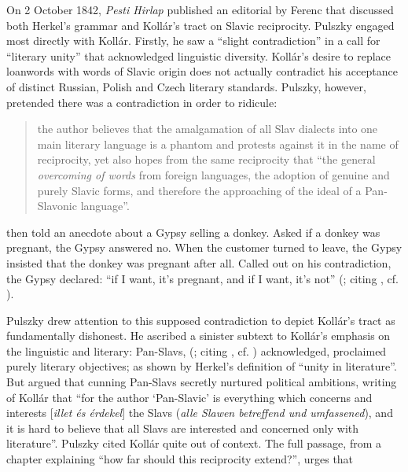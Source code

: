 On 2 October 1842, \textit{Pesti Hirlap} published an editorial by Ferenc \citet[702--703]{pulszky__1842} that discussed both Herkel’s grammar and Kollár’s tract on Slavic reciprocity. Pulszky engaged most directly with Kollár. Firstly, he saw a “slight contradiction” in a call for “literary unity” that acknowledged linguistic diversity. Kollár’s desire to replace loanwords with words of Slavic origin does not actually contradict his acceptance of distinct Russian, Polish and Czech literary standards. Pulszky, however, pretended there was a contradiction in order to ridicule:

\begin{quote}
    the author believes that the amalgamation of all Slav dialects into one main literary language is a phantom and protests against it in the name of reciprocity, yet also hopes from the same reciprocity that “the general \textit{overcoming of words} from foreign languages, the adoption of genuine and purely Slavic forms, and therefore the approaching of the ideal of a Pan-Slavonic language”. \citep[702--703]{pulszky__1842}
\end{quote}

\noindent \citeauthor{pulszky__1842} then told an anecdote about a Gypsy selling a donkey. Asked if a donkey was pregnant, the Gypsy answered no. When the customer turned to leave, the Gypsy insisted that the donkey was pregnant after all. Called out on his contradiction, the Gypsy declared: “if I want, it’s pregnant, and if I want, it’s not” (\citeyear[703]{pulszky__1842}; citing \cite[10, 126]{kollar_uber_1837}, cf. \citeyear[76, 133]{kollar_reciprocity_2009}).

Pulszky drew attention to this supposed contradiction to depict Kollár’s tract as fundamentally dishonest. He ascribed a sinister subtext to Kollár’s emphasis on the linguistic and literary: Pan-Slavs, \citeauthor{pulszky__1842} (\citeyear[703]{pulszky__1842}; citing \cite[89]{kollar_uber_1837}, cf. \cite[116]{kollar_reciprocity_2009}) acknowledged, proclaimed purely literary objectives; as shown by Herkel’s definition of “unity in literature”. But \citet[703]{pulszky__1842} argued that cunning Pan-Slavs secretly nurtured political ambitions, writing of Kollár that “for the author ‘Pan-Slavic’ is everything which concerns and interests [\textit{illet és érdekel}] the Slavs (\textit{alle Slawen betreffend und umfassened}), and it is hard to believe that all Slavs are interested and concerned only with literature”. Pulszky cited Kollár quite out of context. The full passage, from a chapter explaining “how far should this reciprocity extend?”, urges that

